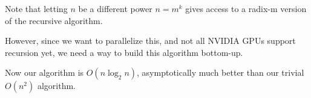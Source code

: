 \documentclass{article}
\begin{document}
Note that letting $n$ be a different power $n=m^k$ gives access to a radix-m version of the recursive algorithm.

However, since we want to parallelize this, and not all NVIDIA GPUs support recursion yet, we need a way to build this algorithm bottom-up.

Now our algorithm is $O(n \log_2n)$, asymptotically much better than our trivial $O(n^2)$ algorithm.
\end{document}
